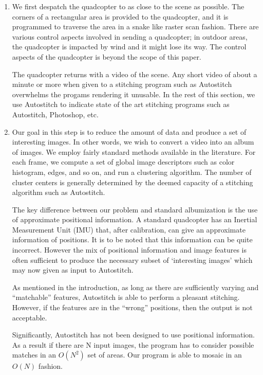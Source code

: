 \documentclass[10pt,twocolumn,letterpaper]{article}
\begin{document}
\begin{enumerate}
\item We first despatch the quadcopter to as close to the scene as
  possible. The corners of a rectangular area is provided to the
  quadcopter, and it is programmed to traverse the area in a snake
  like raster scan fashion.  There are various control aspects
  involved in sending a quadcopter; in outdoor areas, the quadcopter
  is impacted by wind and it might lose its way.  The control aspects
  of the quadcopter is beyond the scope of this paper.

  The quadcopter returns with a video of the scene.  Any short video
  of about a minute or more when given to a stitching program such as
  Autostitch overwhelms the progams rendering it unusable. In the rest
  of this section, we use Autostitch to indicate state of the art
  stitching programs such as Autostitch, Photoshop, etc.

\item Our goal in this step is to reduce the amount of data and
  produce a set of interesting images.  In other words, we wish to
  convert a video into an album of images.  We employ fairly standard
  methods available in the literature.  For each frame, we compute
  a set of global image descriptors such as color histogram, edges,
  and so on, and run a clustering algorithm.  The number of cluster
  centers is generally determined by the deemed capacity of a
  stitching algorithm such as Autostitch. 

  The key difference between our problem and standard albumization is
  the use of approximate positional information.  A standard
  quadcopter has an Inertial Measurement Unit (IMU) that, after
  calibration, can give an approximate information of positions.  It
  is to be noted that this information can be quite incorrect.
  However the mix of positional information and image features is
  often sufficient to produce the necessary subset of `interesting
  images' which may now given as input to Autostitch.

  As mentioned in the introduction, as long as there are sufficiently
  varying and ``matchable'' features, Autostitch is able to perform a
  pleasant stitching.  However, if the features are in the ``wrong''
  positions, then the output is not acceptable. 

  Significantly, Autostitch has not been designed to use positional
  information. As a result if there are N input images, the program
  has to consider possible matches in an $O(N^2)$ set of areas.  Our
  program is able to mosaic in an $O(N)$ fashion. 
 

\end{enumerate}
\end{document}
